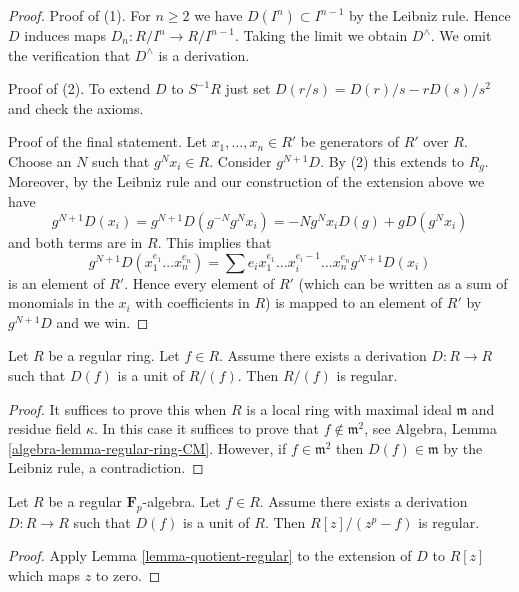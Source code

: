 \begin{proof}
Proof of (1). For $n \geq 2$ we have $D(I^n) \subset I^{n - 1}$
by the Leibniz rule. Hence $D$ induces maps $D_n : R/I^n \to R/I^{n - 1}$.
Taking the limit we obtain $D^\wedge$. We omit the verification that
$D^\wedge$ is a derivation.

\medskip\noindent
Proof of (2). To extend $D$ to $S^{-1}R$ just set
$D(r/s) = D(r)/s - rD(s)/s^2$ and check the axioms.

\medskip\noindent
Proof of the final statement. Let $x_1, \ldots, x_n \in R'$ be generators
of $R'$ over $R$. Choose an $N$ such that $g^Nx_i \in R$.
Consider $g^{N + 1}D$. By (2) this extends to $R_g$. Moreover, by
the Leibniz rule and our construction of the extension above we have
$$
g^{N + 1}D(x_i) = g^{N + 1}D(g^{-N} g^Nx_i) = -Ng^Nx_iD(g) +
gD(g^Nx_i)
$$
and both terms are in $R$. This implies that
$$
g^{N + 1}D(x_1^{e_1} \ldots x_n^{e_n}) =
\sum e_i x_1^{e_1} \ldots x_i^{e_i - 1} \ldots x_n^{e_n} g^{N + 1}D(x_i)
$$
is an element of $R'$. Hence every element of $R'$ (which can be written
as a sum of monomials in the $x_i$ with coefficients in $R$) is mapped to an
element of $R'$ by $g^{N + 1}D$ and we win.
\end{proof}

\begin{lemma}
\label{lemma-quotient-regular}
Let $R$ be a regular ring. Let $f \in R$. Assume there exists a
derivation $D : R \to R$ such that $D(f)$ is a unit of $R/(f)$.
Then $R/(f)$ is regular.
\end{lemma}

\begin{proof}
It suffices to prove this when $R$ is a local ring with maximal ideal
$\mathfrak m$ and residue field $\kappa$. In this case it suffices
to prove that $f \not \in \mathfrak m^2$, see
Algebra, Lemma \ref{algebra-lemma-regular-ring-CM}.
However, if $f \in \mathfrak m^2$ then $D(f) \in \mathfrak m$
by the Leibniz rule, a contradiction.
\end{proof}

\begin{lemma}
\label{lemma-degree-p-extension-regular}
Let $R$ be a regular $\mathbf{F}_p$-algebra. Let $f \in R$.
Assume there exists a derivation $D : R \to R$ such that $D(f)$ is a unit
of $R$. Then $R[z]/(z^p - f)$ is regular.
\end{lemma}

\begin{proof}
Apply Lemma \ref{lemma-quotient-regular}
to the extension of $D$ to $R[z]$ which maps $z$ to zero.
\end{proof}

